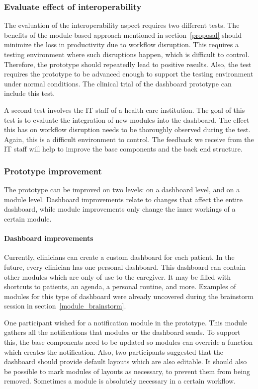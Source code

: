     \subsubsection{Evaluate effect of interoperability}

    The evaluation of the interoperability aspect requires two different tests. The benefits of the module-based approach mentioned in section~\ref{proposal} should minimize the loss in productivity due to workflow disruption. This requires a testing environment where such disruptions happen, which is difficult to control. Therefore, the prototype should repeatedly lead to positive results. Also, the test requires the prototype to be advanced enough to support the testing environment under normal conditions. The clinical trial of the dashboard prototype can include this test.

    A second test involves the IT staff of a health care institution. The goal of this test is to evaluate the integration of new modules into the dashboard. The effect this has on workflow disruption needs to be thoroughly observed during the test. Again, this is a difficult environment to control. The feedback we receive from the IT staff will help to improve the base components and the back end structure.
    
    \subsubsection{Prototype improvement}

    The prototype can be improved on two levels: on a dashboard level, and on a module level. Dashboard improvements relate to changes that affect the entire dashboard, while module improvements only change the inner workings of a certain module. 
    
    \paragraph{Dashboard improvements} Currently, clinicians can create a custom dashboard for each patient. In the future, every clinician has one personal dashboard. This dashboard can contain other modules which are only of use to the caregiver. It may be filled with shortcuts to patients, an agenda, a personal routine, and more. Examples of modules for this type of dashboard were already uncovered during the brainstorm session in section~\ref{module_brainstorm}.

    One participant wished for a notification module in the prototype. This module gathers all the notifications that modules or the dashboard sends. To support this, the base components need to be updated so modules can override a function which creates the notification. Also, two participants suggested that the dashboard should provide default layouts which are also editable. It should also be possible to mark modules of layouts as necessary, to prevent them from being removed. Sometimes a module is absolutely necessary in a certain workflow.

